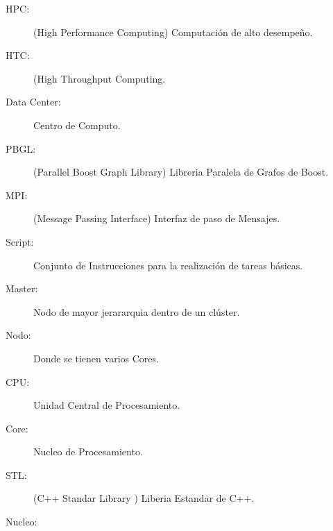 \begin{description}
	\item [HPC:] (High Performance Computing) Computación de alto desempeño.
	\item [HTC:] (High Throughput Computing.
	\item [Data Center:] Centro de Computo.
	\item [PBGL:] (Parallel Boost Graph Library) Libreria Paralela de Grafos de Boost.
	\item [MPI:] (Message Passing Interface) Interfaz de paso de Mensajes.
	\item [Script:] Conjunto de Instrucciones para la realización de tareas básicas.   
	\item [Master:] Nodo de mayor jerararquia dentro de un clúster.
	\item [Nodo:] Donde se tienen varios Cores.
	\item [CPU:] Unidad Central de Procesamiento.
	\item [Core:] Nucleo de Procesamiento.
	\item [STL:] (C++ Standar Library ) Liberia Estandar de C++.
	\item [Nucleo:]
\end{description}